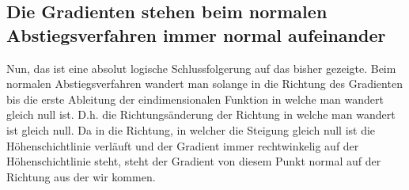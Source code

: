 \documentclass[a4paper, 11pt]{article}
\begin{document}
\subsection{Die Gradienten stehen beim normalen Abstiegsverfahren immer normal aufeinander}
Nun, das ist eine absolut logische Schlussfolgerung auf das bisher gezeigte. Beim normalen Abstiegsverfahren wandert man solange in die Richtung des Gradienten bis die erste Ableitung der eindimensionalen Funktion in welche man wandert gleich null ist. D.h. die Richtungsänderung der Richtung in welche man wandert ist gleich null. Da in die Richtung, in welcher die Steigung gleich null ist die Höhenschichtlinie verläuft und der Gradient immer rechtwinkelig auf der Höhenschichtlinie steht, steht der Gradient von diesem Punkt normal auf der Richtung aus der wir kommen.
\end{document}
